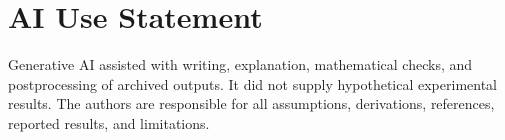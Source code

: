 \documentclass{article}
\begin{document}
\section*{AI Use Statement}
Generative AI assisted with writing, explanation, mathematical checks, and postprocessing of archived outputs. It did not supply hypothetical experimental results. The authors are responsible for all assumptions, derivations, references, reported results, and limitations.
\end{document}
